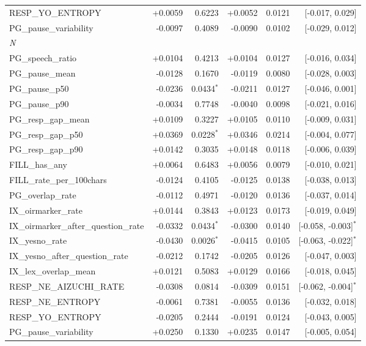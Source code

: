 \begin{longtable}{lrrrrr}
\quad RESP\_YO\_ENTROPY & +0.0059 & 0.6223 & +0.0052 & 0.0121 & [-0.017, 0.029] \\
\quad PG\_pause\_variability & -0.0097 & 0.4089 & -0.0090 & 0.0102 & [-0.029, 0.012] \\
\midrule
\multicolumn{6}{l}{\textit{N}} \\
\quad PG\_speech\_ratio & +0.0104 & 0.4213 & +0.0104 & 0.0127 & [-0.016, 0.034] \\
\quad PG\_pause\_mean & -0.0128 & 0.1670 & -0.0119 & 0.0080 & [-0.028, 0.003] \\
\quad PG\_pause\_p50 & -0.0236 & 0.0434$^{*}$ & -0.0211 & 0.0127 & [-0.046, 0.001] \\
\quad PG\_pause\_p90 & -0.0034 & 0.7748 & -0.0040 & 0.0098 & [-0.021, 0.016] \\
\quad PG\_resp\_gap\_mean & +0.0109 & 0.3227 & +0.0105 & 0.0110 & [-0.009, 0.031] \\
\quad PG\_resp\_gap\_p50 & +0.0369 & 0.0228$^{*}$ & +0.0346 & 0.0214 & [-0.004, 0.077] \\
\quad PG\_resp\_gap\_p90 & +0.0142 & 0.3035 & +0.0148 & 0.0118 & [-0.006, 0.039] \\
\quad FILL\_has\_any & +0.0064 & 0.6483 & +0.0056 & 0.0079 & [-0.010, 0.021] \\
\quad FILL\_rate\_per\_100chars & -0.0124 & 0.4105 & -0.0125 & 0.0138 & [-0.038, 0.013] \\
\quad PG\_overlap\_rate & -0.0112 & 0.4971 & -0.0120 & 0.0136 & [-0.037, 0.014] \\
\quad IX\_oirmarker\_rate & +0.0144 & 0.3843 & +0.0123 & 0.0173 & [-0.019, 0.049] \\
\quad IX\_oirmarker\_after\_question\_rate & -0.0332 & 0.0434$^{*}$ & -0.0300 & 0.0140 & [-0.058, -0.003]$^{*}$ \\
\quad IX\_yesno\_rate & -0.0430 & 0.0026$^{*}$ & -0.0415 & 0.0105 & [-0.063, -0.022]$^{*}$ \\
\quad IX\_yesno\_after\_question\_rate & -0.0212 & 0.1742 & -0.0205 & 0.0126 & [-0.047, 0.003] \\
\quad IX\_lex\_overlap\_mean & +0.0121 & 0.5083 & +0.0129 & 0.0166 & [-0.018, 0.045] \\
\quad RESP\_NE\_AIZUCHI\_RATE & -0.0308 & 0.0814 & -0.0309 & 0.0151 & [-0.062, -0.004]$^{*}$ \\
\quad RESP\_NE\_ENTROPY & -0.0061 & 0.7381 & -0.0055 & 0.0136 & [-0.032, 0.018] \\
\quad RESP\_YO\_ENTROPY & -0.0205 & 0.2444 & -0.0191 & 0.0124 & [-0.043, 0.005] \\
\quad PG\_pause\_variability & +0.0250 & 0.1330 & +0.0235 & 0.0147 & [-0.005, 0.054] \\
\end{longtable}
\endgroup
